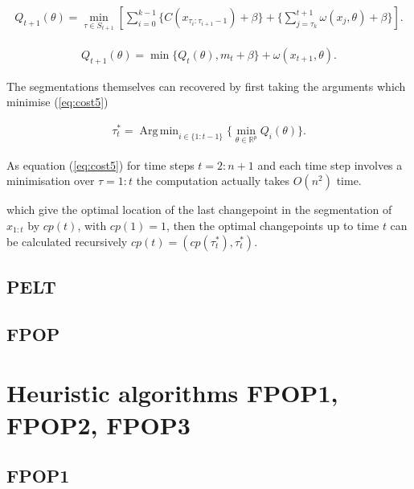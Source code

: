 \documentclass[a4paper,12pt]{article}
\DeclareMathOperator*{\argmin}{Arg\,min}
\begin{document}
		 \begin{equation}
		 	\begin{gathered}
		 		Q_{t+1} (\theta) = \min_{\tau \in S_{t+1}}\left[ \sum_{i=0}^{k-1} \{C(x_{\tau_i:\tau_{i+1}-1})+\beta\} + \{ \sum_{j=\tau_{k}}^{t+1}  \omega(x_j, \theta)+\beta \} \right].
		 	\end{gathered}
		 	\label{eq:cost4}
		 \end{equation}
		 
		 \begin{equation}
		 	\begin{gathered}
		 		Q_{t+1} (\theta) = \min \{Q_t(\theta),m_t +\beta \} +\omega(x_{t+1}, \theta).
		 	\end{gathered}
		 	\label{eq:cost5}
		 \end{equation}
		 
		 The segmentations themselves can recovered by first taking the arguments which minimise (\ref{eq:cost5}) 
		 
		 \begin{equation}
		 	\begin{gathered}
		 		\tau_t^* = \argmin_{i \in \{1:t-1\}}\{ \min_{\theta \in\mathbb{R}^p }Q_i(\theta)\}.
		 	\end{gathered}
		 	\label{eq:tau2}
		\end{equation}
	 	
	 	As equation (\ref{eq:cost5}) for time steps $t = 2:n+1$ and each time step involves a minimisation over $\tau = 1:t$ the computation actually takes $O(n^2)$ time.
		
		which give the optimal location of the last changepoint in the segmentation of $x_{1:t}$ by $cp(t)$, with $cp(1) = 1$, then the optimal changepoints up to time $t$ can be calculated recursively $cp(t) = (cp(\tau_t^*), \tau_t^*)$.
		\subsection{PELT}
		\label{PELT}
		
		
		\subsection{FPOP}
		\label{FPOP}	
	\section{Heuristic algorithms FPOP1, FPOP2, FPOP3}
	\label{section3}
		\subsection{FPOP1}
		\label{FPOP1}
\end{document}
